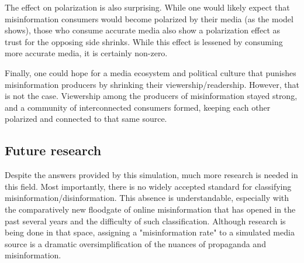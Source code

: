 \documentclass[titlepage, 12pt, leqno]{article}
\begin{document}
The effect on polarization is also surprising. While one would likely expect that misinformation consumers would become polarized by their media (as the model shows), those who consume accurate media also show a polarization effect as trust for the opposing side shrinks. While this effect is lessened by consuming more accurate media, it is certainly non-zero.

Finally, one could hope for a media ecosystem and political culture that punishes misinformation producers by shrinking their viewership/readership. However, that is not the case. Viewership among the producers of misinformation stayed strong, and a community of interconnected consumers formed, keeping each other polarized and connected to that same source.

\subsection{Future research}
Despite the answers provided by this simulation, much more research is needed in this field. Most importantly, there is no widely accepted standard for classifying misinformation/disinformation. This absence is understandable, especially with the comparatively new floodgate of online misinformation that has opened in the past several years and the difficulty of such classification. Although research is being done in that space, assigning a "misinformation rate" to a simulated media source is a dramatic oversimplification of the nuances of propaganda and misinformation. 

\pagebreak
\end{document}
